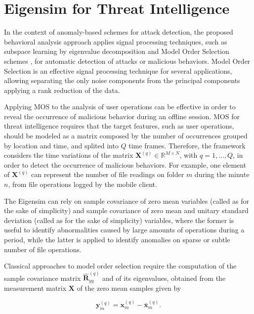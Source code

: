 \section{Eigensim for Threat Intelligence}
\label{sec:3_eigensim}
In the context of anomaly-based schemes for attack detection, the proposed behavioral analysis approach applies signal processing techniques, such as subspace learning by eigenvalue decomposition and Model Order Selection schemes \cite{tenorio2013greatest}, for automatic detection of attacks or malicious behaviors. Model Order Selection is an effective signal processing technique for several applications, allowing separating the only noise components from the principal components applying a rank reduction of the data. 

Applying MOS to the analysis of user operations can be effective in order to reveal the occurrence of malicious behavior during an offline session. MOS for threat intelligence requires that the target features, such as user operations, should be modeled as a matrix composed by the number of occurrences grouped by location and time, and splited into $Q$ time frames. Therefore, the framework considers the time variations of the matrix $\pmb{X}^{(q)} \in \mathbb{R}^{M\times{N}}$, with $q = 1, \ldots, Q$, in order to detect the occurrence of malicious behaviors. For example, one element of $\pmb{X}^{(q)}$ can represent the number of file readings on folder $m$ during the minute $n$, from file operations logged by the mobile client.

The Eigensim can rely on sample covariance of zero mean variables (called as  for the sake of simplicity) and sample covariance of zero mean and unitary standard deviation (called as  for the sake of simplicity) variables, where the former is useful to identify abnormalities caused by large amounts of operations during a period, while the latter is applied to identify anomalies on sparse or subtle number of file operations.

Classical approaches to model order selection require the computation of the sample covariance matrix $\hat{\pmb{R}}_{yy}^{(q)}$ and of its eigenvalues, obtained from the measurement matrix $\pmb{X}$ of the zero mean samples given by

\begin{equation}\label{eq:3.03}
	\pmb{y}_{m}^{(q)} = \pmb{x}_{m}^{(q)} - \bar{\pmb{x}}_{m}^{(q)}.
\end{equation}

